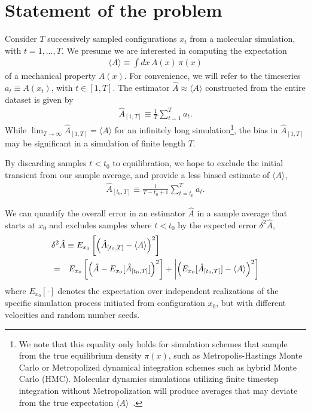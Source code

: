\documentclass[aps,pre,twocolumn,nofootinbib,superscriptaddress,linenumbers,11point]{revtex4-1}
\newcommand{\expect}[1]{\langle #1 \rangle}                %
\begin{document}
\section*{Statement of the problem}

Consider $T$ successively sampled configurations $x_t$ from a molecular simulation, with $t = 1, \ldots, T$.
We presume we are interested in computing the expectation
\begin{eqnarray}
\expect{A} \equiv \int dx \, A(x) \, \pi(x)
\end{eqnarray}
of a mechanical property $A(x)$.
For convenience, we will refer to the timeseries $a_t \equiv A(x_t)$, with $t \in [1,T]$.
The estimator $\hat{A} \approx \expect{A}$ constructed from the entire dataset is given by
\begin{eqnarray}
\hat{A}_{[1,T]} \equiv \frac{1}{T} \sum_{t=1}^T a_t . \label{equation:time-average}
\end{eqnarray}
While $\lim_{T \rightarrow \infty} \hat{A}_{[1,T]} = \expect{A}$ for an infinitely long simulation\footnote{We note that this equality only holds for simulation schemes that sample from the true equilibrium density $\pi(x)$, such as Metropolis-Hastings Monte Carlo or Metropolized dynamical integration schemes such as hybrid Monte Carlo (HMC). Molecular dynamics simulations utilizing finite timestep integration without Metropolization will produce averages that may deviate from the true expectation $\expect{A}$~\cite{sivak:2013:prx:vvvr}.}, the bias in $\hat{A}_{[1,T]}$ may be significant in a simulation of finite length $T$.

By discarding samples $t < t_0$ to equilibration, we hope to exclude the initial transient from our sample average, and provide a less biased estimate of $\expect{A}$,
\begin{eqnarray}
\hat{A}_{[t_0,T]} \equiv \frac{1}{T-t_0+1} \sum_{t=t_0}^T a_t . \label{equation:production-time-average} 
\end{eqnarray}

We can quantify the overall error in an estimator $\hat{A}$ in a sample average that starts at $x_0$ and excludes samples where $t < t_0$ by the expected error $\delta^2 \hat{A}$,
\begin{eqnarray}
\lefteqn{\delta^2 \hat{A} \equiv E_{x_0} \left[ \left( \hat{A}_{[t_0,T]} - \expect{A} \right)^2 \right]} \label{equation:rms-error} \\
&=& E_{x_0}\left[ \left( \hat{A} - E_{x_0}[\hat{A}_{[t_0,T]}] \right)^2 \right] + \left| \left( E_{x_0}[\hat{A}_{[t_0,T]}] - \expect{A} \right)^2 \right] \label{equation:bias-variance}  \nonumber
\end{eqnarray}
where $E_{x_0}[\cdot]$ denotes the expectation over independent realizations of the specific simulation process initiated from configuration $x_0$, but with different velocities and random number seeds.
\end{document}
